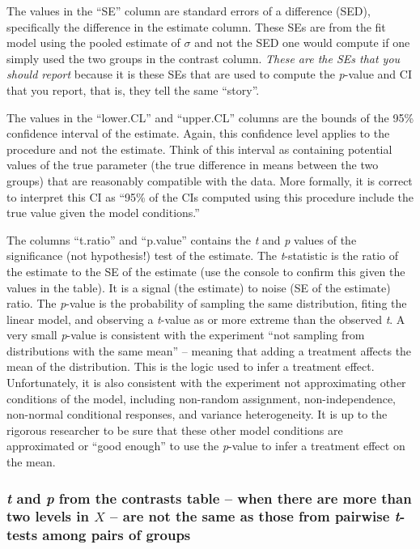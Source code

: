 \documentclass[]{book}
\begin{document}
The values in the ``SE'' column are standard errors of a difference (SED), specifically the difference in the estimate column. These SEs are from the fit model using the pooled estimate of \(\sigma\) and not the SED one would compute if one simply used the two groups in the contrast column. \emph{These are the SEs that you should report} because it is these SEs that are used to compute the \emph{p}-value and CI that you report, that is, they tell the same ``story''.

The values in the ``lower.CL'' and ``upper.CL'' columns are the bounds of the 95\% confidence interval of the estimate. Again, this confidence level applies to the procedure and not the estimate. Think of this interval as containing potential values of the true parameter (the true difference in means between the two groups) that are reasonably compatible with the data. More formally, it is correct to interpret this CI as ``95\% of the CIs computed using this procedure include the true value given the model conditions.''

The columns ``t.ratio'' and ``p.value'' contains the \emph{t} and \emph{p} values of the significance (not hypothesis!) test of the estimate. The \emph{t}-statistic is the ratio of the estimate to the SE of the estimate (use the console to confirm this given the values in the table). It is a signal (the estimate) to noise (SE of the estimate) ratio. The \emph{p}-value is the probability of sampling the same distribution, fiting the linear model, and observing a \emph{t}-value as or more extreme than the observed \emph{t}. A very small \emph{p}-value is consistent with the experiment ``not sampling from distributions with the same mean'' -- meaning that adding a treatment affects the mean of the distribution. This is the logic used to infer a treatment effect. Unfortunately, it is also consistent with the experiment not approximating other conditions of the model, including non-random assignment, non-independence, non-normal conditional responses, and variance heterogeneity. It is up to the rigorous researcher to be sure that these other model conditions are approximated or ``good enough'' to use the \emph{p}-value to infer a treatment effect on the mean.

\hypertarget{t-and-p-from-the-contrasts-table-when-there-are-more-than-two-levels-in-x-are-not-the-same-as-those-from-pairwise-t-tests-among-pairs-of-groups}{%
\subsubsection{\texorpdfstring{\emph{t} and \emph{p} from the contrasts table -- when there are more than two levels in \(X\) -- are not the same as those from pairwise \emph{t}-tests among pairs of groups}{t and p from the contrasts table -- when there are more than two levels in X -- are not the same as those from pairwise t-tests among pairs of groups}}\label{t-and-p-from-the-contrasts-table-when-there-are-more-than-two-levels-in-x-are-not-the-same-as-those-from-pairwise-t-tests-among-pairs-of-groups}}
\end{document}
